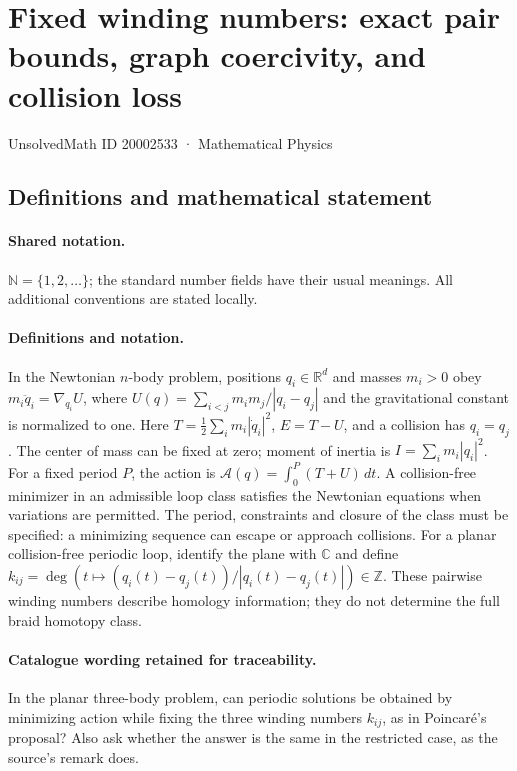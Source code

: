 \documentclass[11pt]{article}
\begin{document}
\setcounter{section}{20002532}
\section{Fixed winding numbers: exact pair bounds, graph coercivity, and collision loss}\label{20002533}
{\small UnsolvedMath ID 20002533 · Mathematical Physics}
\subsection{Definitions and mathematical statement}

\paragraph{Shared notation.}$\mathbb N=\{1,2,\ldots\}$; the standard number fields have their usual meanings. All additional conventions are stated locally.


\paragraph{Definitions and notation.}In the Newtonian $n$-body problem, positions $q_i\in\mathbb R^d$ and masses $m_i>0$ obey $m_i\ddot q_i=\nabla_{q_i}U$, where $U(q)=\sum_{i<j}m_im_j/|q_i-q_j|$ and the gravitational constant is normalized to one. Here $T=\tfrac12\sum_i m_i|\dot q_i|^2$, $E=T-U$, and a collision has $q_i=q_j$. The center of mass can be fixed at zero; moment of inertia is $I=\sum_i m_i|q_i|^2$. For a fixed period $P$, the action is $\mathcal A(q)=\int_0^P(T+U)\,dt$. A collision-free minimizer in an admissible loop class satisfies the Newtonian equations when variations are permitted. The period, constraints and closure of the class must be specified: a minimizing sequence can escape or approach collisions. For a planar collision-free periodic loop, identify the plane with $\mathbb C$ and define $k_{ij}=\deg(t\mapsto(q_i(t)-q_j(t))/|q_i(t)-q_j(t)|)\in\mathbb Z$. These pairwise winding numbers describe homology information; they do not determine the full braid homotopy class. 

\paragraph{Catalogue wording retained for traceability.}
In the planar three-body problem, can periodic solutions be obtained by minimizing action while fixing the three winding numbers $k_{ij}$, as in Poincaré's proposal? Also ask whether the answer is the same in the restricted case, as the source’s remark does.
\end{document}
